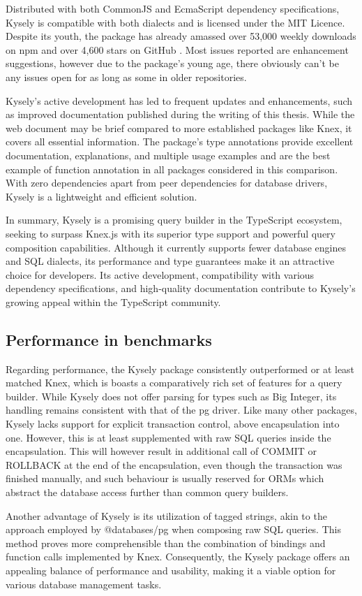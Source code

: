 Distributed with both CommonJS and EcmaScript dependency specifications, Kysely
is compatible with both dialects and is licensed under the MIT Licence. Despite
its youth, the package has already amassed over 53,000 weekly downloads on npm
and over 4,600 stars on GitHub \cite{kyselyGithub}. Most issues reported are
enhancement suggestions, however due to the package's young age, there obviously
can't be any issues open for as long as some in older repositories.

Kysely's active development has led to frequent updates and enhancements, such
as improved documentation published during the writing of this thesis. While the
web document may be brief compared to more established packages like Knex, it
covers all essential information. The package's type annotations provide
excellent documentation, explanations, and multiple usage examples and are the
best example of function annotation in all packages considered in this
comparison. With zero dependencies apart from peer dependencies for database
drivers, Kysely is a lightweight and efficient solution.

In summary, Kysely is a promising query builder in the TypeScript ecosystem,
seeking to surpass Knex.js with its superior type support and powerful query
composition capabilities. Although it currently supports fewer database engines
and SQL dialects, its performance and type guarantees make it an attractive
choice for developers. Its active development, compatibility with various
dependency specifications, and high-quality documentation contribute to Kysely's
growing appeal within the TypeScript community.

\subsection*{Performance in benchmarks}

Regarding performance, the Kysely package consistently outperformed or at least
matched Knex, which is boasts a comparatively rich set of features for a query
builder. While Kysely does not offer parsing for types such as Big Integer, its
handling remains consistent with that of the pg driver. Like many other
packages, Kysely lacks support for explicit transaction control, above
encapsulation into one. However, this is at least supplemented with raw SQL
queries inside the encapsulation. This will however result in additional call of
COMMIT or ROLLBACK at the end of the encapsulation, even though the transaction
was finished manually, and such behaviour is usually reserved for ORMs which
abstract the database access further than common query builders.

Another advantage of Kysely is its utilization of tagged strings, akin to the
approach employed by @databases/pg when composing raw SQL queries. This method
proves more comprehensible than the combination of bindings and function calls
implemented by Knex. Consequently, the Kysely package offers an appealing
balance of performance and usability, making it a viable option for various
database management tasks.

